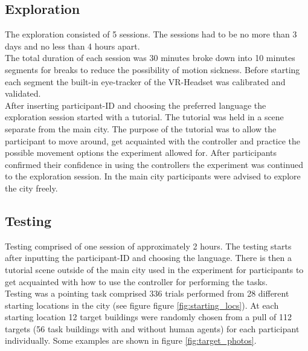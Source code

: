 \subsection{Exploration}

The exploration consisted of 5 sessions. The sessions had to be no more than 3 days and no less than 4 hours apart. \\
The total duration of each session was 30 minutes broke down into 10 minutes segments for breaks to reduce the possibility of motion sickness. Before starting each segment the built-in eye-tracker of the VR-Headset was calibrated and validated. \\

After inserting participant-ID and choosing the preferred language the exploration session started with a tutorial. The tutorial was held in a scene separate from the main city. The purpose of the tutorial was to allow the participant to move around, get acquainted with the controller and practice the possible movement options the experiment allowed for. After participants confirmed their confidence in using the controllers the experiment was continued to the exploration session. In the main city participants were advised to explore the city freely.

\subsection{Testing}

Testing comprised of one session of approximately 2 hours. The testing starts after inputting the participant-ID and choosing the language. There is then a tutorial scene outside of the main city used in the experiment for participants to get acquainted with how to use the controller for performing the tasks. \\

Testing was a pointing task comprised 336 trials performed from 28 different starting locations in the city (see figure figure \ref{fig:starting_locs}). At each starting location 12 target buildings were randomly chosen from a pull of 112 targets (56 task buildings with and without human agents) for each participant individually. Some examples are shown in figure \ref{fig:target_photos}. 

